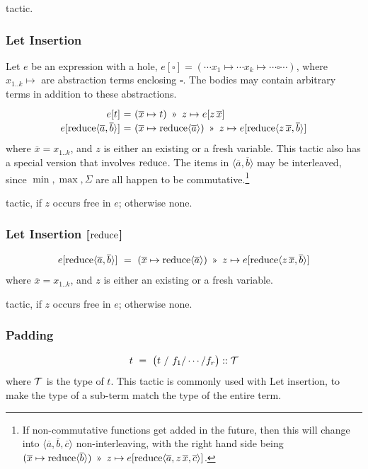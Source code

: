 \Obligations tactic.

\subsubsection{Let Insertion}

Let $e$ be an expression with a hole, $e[\square] = (\cdots x_1 \mapsto \cdots x_k\mapsto \cdots \square \cdots)$, 
where $x_{1..k}\mapsto$ are abstraction terms enclosing $\square$. The bodies may contain arbitrary terms
in addition to these abstractions.
%
\[\renewcommand\arraystretch{1.2}
  \begin{array}{@{}r@{}c@{}l@{}}
  e[t] & ~=~ & (\overline{x}\mapsto t) ~\applt~ z\mapsto e[z\,\overline{x}] \\
  e[\reduce \langle\overline{a},\overline{b}\rangle] & ~=~ &
     (\overline{x}\mapsto \reduce\langle\overline{a}\rangle) ~\applt~ z\mapsto e[\reduce\langle z\,\overline{x}, \overline{b}\rangle]
  \end{array}\]
%
where $\overline{x}=x_{1..k}$, and $z$ is either an existing or a fresh variable.
This tactic also has a special version that involves $\operatorname{reduce}$.
The items in $\langle \overline{a},\overline{b}\rangle$ may be interleaved, since
$\min,\max,\Sigma$ are all happen to be commutative.\footnote{If non-commutative functions get added in the future, then this will change into $\langle \overline{a}, \overline{b}, \overline{c}\rangle$ non-interleaving, with the right hand side being $(\overline{x}\mapsto \reduce\langle\overline{b}\rangle) ~\applt~ z\mapsto e[\reduce\langle \overline{a}, z\,\overline{x}, \overline{c}\rangle]$.}

\Obligations tactic, if $z$ occurs free in $e$; otherwise none.

\subsubsection{Let Insertion [$\operatorname{reduce}$]}
%
\[e[\reduce \langle\overline{a},\overline{b}\rangle] ~=~ 
  (\overline{x}\mapsto \reduce\langle\overline{a}\rangle) ~\applt~ z\mapsto e[\reduce\langle z\,\overline{x}, \overline{b}\rangle]\]
%
where $\overline{x}=x_{1..k}$, and $z$ is either an existing or a fresh variable.

\Obligations tactic, if $z$ occurs free in $e$; otherwise none.

\subsubsection{Padding}
\[t ~=~ \big(t~/~f_1/\cdots/f_r\big) :: \mathcal{T}\]
%
where $\mathcal{T}$ is the type of $t$. This tactic is commonly used with Let insertion,
to make the type of a sub-term match the type of the entire term.

